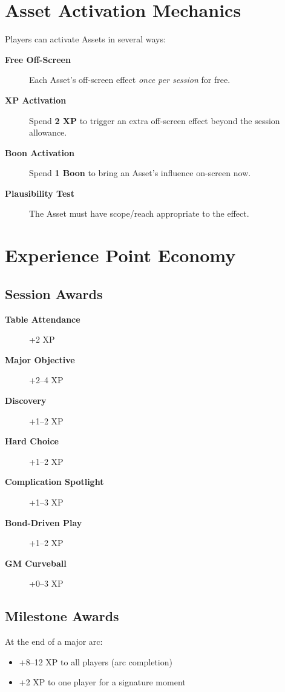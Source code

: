 \section{Asset Activation Mechanics}
\label{sec:asset-activations}
Players can activate Assets in several ways:
\begin{description}
\item[\textbf{Free Off-Screen}] Each Asset’s off-screen effect \emph{once per session} for free. 
\item[\textbf{XP Activation}] Spend \textbf{2 XP} to trigger an extra off-screen effect beyond the session allowance. 
\item[\textbf{Boon Activation}] Spend \textbf{1 Boon} to bring an Asset’s influence on-screen now. 
\item[\textbf{Plausibility Test}] The Asset must have scope/reach appropriate to the effect. 
\end{description}

\section{Experience Point Economy}
\label{sec:xp-economy}

\subsection{Session Awards}
\label{subsec:session-awards}
\begin{description}
\item[\textbf{Table Attendance}] +2 XP
\item[\textbf{Major Objective}] +2–4 XP
\item[\textbf{Discovery}] +1–2 XP
\item[\textbf{Hard Choice}] +1–2 XP
\item[\textbf{Complication Spotlight}] +1–3 XP
\item[\textbf{Bond-Driven Play}] +1–2 XP
\item[\textbf{GM Curveball}] +0–3 XP
\end{description}

\subsection{Milestone Awards}
\label{subsec:milestone-awards}
At the end of a major arc:
\begin{itemize}
\item +8–12 XP to all players (arc completion)
\item +2 XP to one player for a signature moment
\end{itemize}

